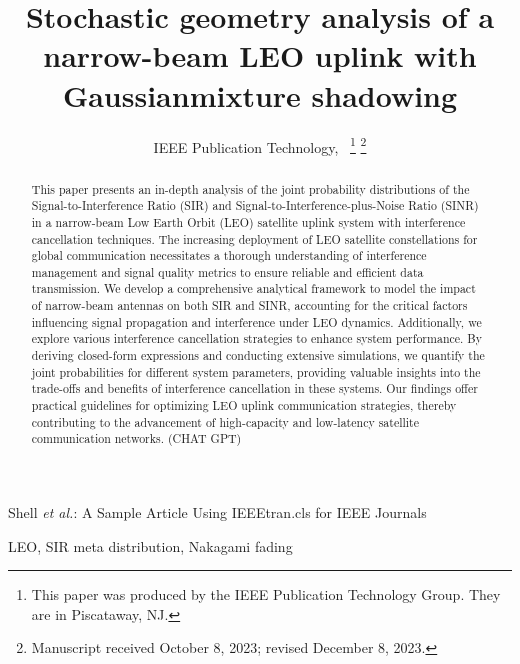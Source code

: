 \documentclass[lettersize,journal]{IEEEtran}
\begin{document}
\title{Stochastic geometry analysis of a narrow-beam LEO uplink with Gaussianmixture shadowing}
\author{IEEE Publication Technology,~
\thanks{This paper was produced by the IEEE Publication Technology Group. They are in Piscataway, NJ.}%
\thanks{Manuscript received October 8, 2023; revised December 8, 2023.}}

%
{Shell \MakeLowercase{\textit{et al.}}: A Sample Article Using IEEEtran.cls for IEEE Journals}

\IEEEpubid{}


\maketitle
\begin{abstract}
  This paper presents an in-depth analysis of the joint probability distributions of the Signal-to-Interference Ratio (SIR) and Signal-to-Interference-plus-Noise Ratio (SINR) in a narrow-beam Low Earth Orbit (LEO) satellite uplink system with interference cancellation techniques. The increasing deployment of LEO satellite constellations for global communication necessitates a thorough understanding of interference management and signal quality metrics to ensure reliable and efficient data transmission. We develop a comprehensive analytical framework to model the impact of narrow-beam antennas on both SIR and SINR, accounting for the critical factors influencing signal propagation and interference under LEO dynamics. Additionally, we explore various interference cancellation strategies to enhance system performance. By deriving closed-form expressions and conducting extensive simulations, we quantify the joint probabilities for different system parameters, providing valuable insights into the trade-offs and benefits of interference cancellation in these systems. Our findings offer practical guidelines for optimizing LEO uplink communication strategies, thereby contributing to the advancement of high-capacity and low-latency satellite communication networks. (CHAT GPT)
\end{abstract}

\begin{IEEEkeywords}
  LEO, SIR meta distribution, Nakagami fading
\end{IEEEkeywords}
\end{document}
